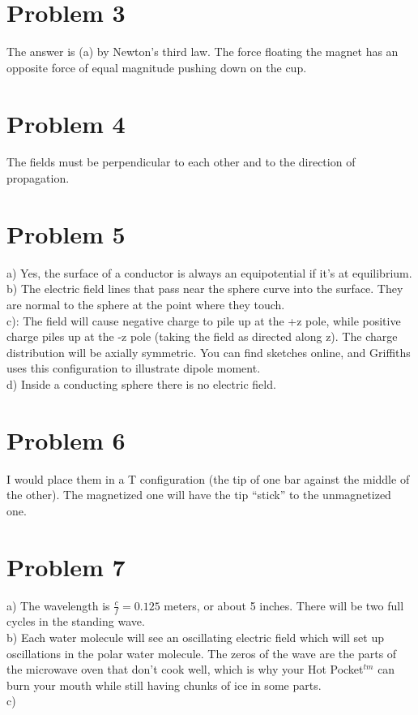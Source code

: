 \documentclass[a4paper,11pt]{article}
\numberwithin{equation}{section}
\begin{document}
\section{Problem 3}
The answer is (a) by Newton's third law. 
The force floating the magnet has an opposite force of equal magnitude pushing down on the cup.
\\
\section{Problem 4}
The fields must be perpendicular to each other and to the direction of propagation.
\\
\section{Problem 5}
a) Yes, the surface of a conductor is always an equipotential if it's at equilibrium.\\
b) The electric field lines that pass near the sphere curve into the surface. They are normal to the sphere at the point where they touch.\\
c): The field will cause negative charge to pile up at the +z pole, while positive charge piles up at the -z pole (taking the field as directed along z).
The charge distribution will be axially symmetric. You can find sketches online, and Griffiths uses this configuration to illustrate dipole moment.\\
d) Inside a conducting sphere there is no electric field.
\\
\section{Problem 6}
I would place them in a T configuration (the tip of one bar against the middle of the other).
The magnetized one will have the tip ``stick'' to the unmagnetized one.
\\
\section{Problem 7}
a) The wavelength is $\frac{c}{f}=0.125$ meters, or about 5 inches. 
There will be two full cycles in the standing wave.\\
b) Each water molecule will see an oscillating electric field which will set up oscillations in the polar water molecule. 
The zeros of the wave are the parts of the microwave oven that don't cook well, which is why your Hot Pocket$^{tm}$ can
burn your mouth while still having chunks of ice in some parts.\\
c) 
\\
\end{document}
